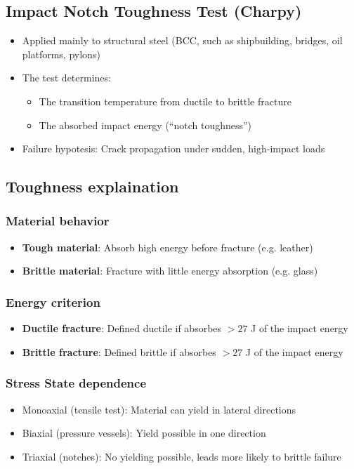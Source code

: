 \documentclass{article}
\begin{document}
\subsection{Impact Notch Toughness Test (Charpy)}
\begin{itemize}
  \item Applied mainly to structural steel (BCC, such as shipbuilding, bridges, oil platforms, pylons)
  \item The test determines:
  \begin{itemize}
    \item The transition temperature from ductile to brittle fracture
    \item The absorbed impact energy (``notch toughness'')
  \end{itemize}
  \item Failure hypotesis: Crack propagation under sudden, high-impact loads
\end{itemize}

\subsection{Toughness explaination}
\subsubsection{Material behavior}
\begin{itemize}
  \item \textbf{Tough material}: Absorb high energy before fracture (e.g. leather)
  \item \textbf{Brittle material}: Fracture with little energy absorption (e.g. glass)
\end{itemize}

\subsubsection{Energy criterion}
\begin{itemize}
  \item \textbf{Ductile fracture}: Defined ductile if absorbes $> 27$ J of the impact energy
  \item \textbf{Brittle fracture}: Defined brittle if absorbes $> 27$ J of the impact energy
\end{itemize}

\subsubsection{Stress State dependence}
\begin{itemize}
  \item Monoaxial (tensile test): Material can yield in lateral directions
  \item Biaxial (pressure vessels): Yield possible in one direction
  \item Triaxial (notches): No yielding possible, leads more likely to brittle failure
\end{itemize}
\end{document}
